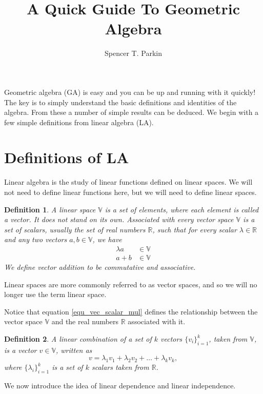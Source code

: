 \documentclass[12pt]{article}
\title{A Quick Guide To Geometric Algebra}
\author{Spencer T. Parkin}
\newcommand{\V}{\mathbb{V}}
\newcommand{\R}{\mathbb{R}}
\newtheorem{definition}{Definition}[section]
\begin{document}
\maketitle

Geometric algebra (GA) is easy and you can be up and running with it quickly!  The key is to
simply understand the basic definitions and identities of the algebra.  From these a number
of simple results can be deduced.  We begin with a few simple definitions from linear algebra (LA).

\section{Definitions of LA}

Linear algebra is the study of linear functions defined on linear spaces.  We will not need
to define linear functions here, but we will need to define linear spaces.
\begin{definition}\label{def_vec_space}
A linear space $\V$ is a set of elements, where each element is called a vector.  It does not stand on its own.
Associated with every vector space $\V$ is a set of scalars, usually the set of real numbers $\R$,
such that for every scalar $\lambda\in\R$ and any two vectors $a,b\in\V$, we have
\begin{align}
\lambda a &\in \V\label{equ_vec_scalar_mul} \\
a+b &\in\V\label{equ_vec_addition}
\end{align}
We define vector addition to be commutative and associative.
\end{definition}
Linear spaces are more commonly referred to as vector spaces, and so we will no longer
use the term linear space.

Notice that equation \eqref{equ_vec_scalar_mul} defines the relationship between the
vector space $\V$ and the real numbers $\R$ associated with it.

\begin{definition}
A linear combination of a set of $k$ vectors $\{v_i\}_{i=1}^k$, taken from $\V$, is
a vector $v\in\V$, written as
\begin{equation}
v = \lambda_1 v_1 + \lambda_2 v_2 + \dots + \lambda_k v_k,
\end{equation}
where $\{\lambda_i\}_{i=1}^k$ is a set of $k$ scalars taken from $\R$.
\end{definition}

We now introduce the idea of linear dependence and linear independence.
\end{document}
